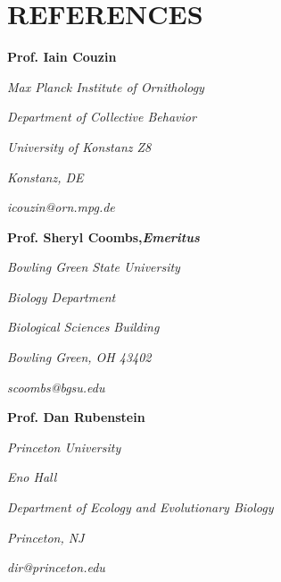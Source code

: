 \documentclass[paper=a4,fontsize=11pt]{scrartcl}	 			%
\newcommand{\sepspace}{\vspace*{1em}}			%
\newcommand{\NewPart}[1]{\section*{\uppercase{#1}}}
\newcommand{\EducationEntry}[4]{
		\noindent \textbf{#1} \hfill 					%
		\colorbox{White}{%
			\parbox{10em}{%
			\hfill\color{Black}#2}} \par				%
		\noindent \textit{#3} \par					%
		\noindent\hangindent=2em\hangafter=0 \small #4 	%
		\normalsize \par}
\newcommand{\WorkEntry}[4]{						%
		\noindent \textbf{#1} \hfill 					%
		\colorbox{White}{\color{Black}#2} \par		%
		\noindent \textit{#3} \par					%
		\noindent\hangindent=2em\hangafter=0 \small #4 	%
		\normalsize \par}
\newcommand{\RefEntry}[7]{						%
		\noindent \textbf{#1} \par 					%
		\noindent \textit{#2} \par	%
		\noindent \textit{#3} \par
		\noindent \textit{#4} \par%
		\noindent \textit{#5} \par
		\noindent \textit{#6} \par
		\noindent \textit{#7} \par
		}
\begin{document}
\NewPart{References}
\RefEntry{Prof. Iain Couzin}{Max Planck Institute of Ornithology}{Department of Collective Behavior}{University of Konstanz Z8}{Konstanz, DE}{icouzin@orn.mpg.de}{}
\RefEntry{Prof. Sheryl Coombs,\textit{Emeritus}}{Bowling Green State University}{Biology Department}{Biological Sciences Building}{Bowling Green, OH 43402}{scoombs@bgsu.edu}{}
\RefEntry{Prof. Dan Rubenstein}{Princeton University}{Eno Hall}{Department of Ecology and Evolutionary Biology}{Princeton, NJ}{dir@princeton.edu}{}
%
%
%
\end{document}
